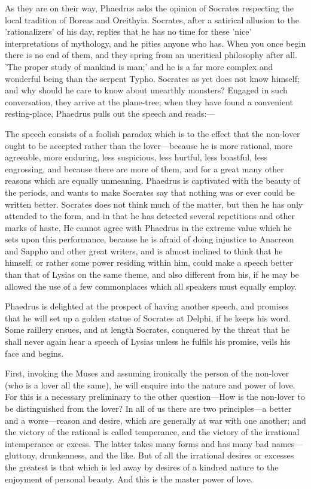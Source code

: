 \documentclass[11pt,letter]{article}
\begin{document}
\par  As they are on their way, Phaedrus asks the opinion of Socrates respecting the local tradition of Boreas and Oreithyia. Socrates, after a satirical allusion to the 'rationalizers' of his day, replies that he has no time for these 'nice' interpretations of mythology, and he pities anyone who has. When you once begin there is no end of them, and they spring from an uncritical philosophy after all. 'The proper study of mankind is man;' and he is a far more complex and wonderful being than the serpent Typho. Socrates as yet does not know himself; and why should he care to know about unearthly monsters? Engaged in such conversation, they arrive at the plane-tree; when they have found a convenient resting-place, Phaedrus pulls out the speech and reads:—

\par  The speech consists of a foolish paradox which is to the effect that the non-lover ought to be accepted rather than the lover—because he is more rational, more agreeable, more enduring, less suspicious, less hurtful, less boastful, less engrossing, and because there are more of them, and for a great many other reasons which are equally unmeaning. Phaedrus is captivated with the beauty of the periods, and wants to make Socrates say that nothing was or ever could be written better. Socrates does not think much of the matter, but then he has only attended to the form, and in that he has detected several repetitions and other marks of haste. He cannot agree with Phaedrus in the extreme value which he sets upon this performance, because he is afraid of doing injustice to Anacreon and Sappho and other great writers, and is almost inclined to think that he himself, or rather some power residing within him, could make a speech better than that of Lysias on the same theme, and also different from his, if he may be allowed the use of a few commonplaces which all speakers must equally employ.

\par  Phaedrus is delighted at the prospect of having another speech, and promises that he will set up a golden statue of Socrates at Delphi, if he keeps his word. Some raillery ensues, and at length Socrates, conquered by the threat that he shall never again hear a speech of Lysias unless he fulfils his promise, veils his face and begins.

\par  First, invoking the Muses and assuming ironically the person of the non-lover (who is a lover all the same), he will enquire into the nature and power of love. For this is a necessary preliminary to the other question—How is the non-lover to be distinguished from the lover? In all of us there are two principles—a better and a worse—reason and desire, which are generally at war with one another; and the victory of the rational is called temperance, and the victory of the irrational intemperance or excess. The latter takes many forms and has many bad names—gluttony, drunkenness, and the like. But of all the irrational desires or excesses the greatest is that which is led away by desires of a kindred nature to the enjoyment of personal beauty. And this is the master power of love.
\end{document}
